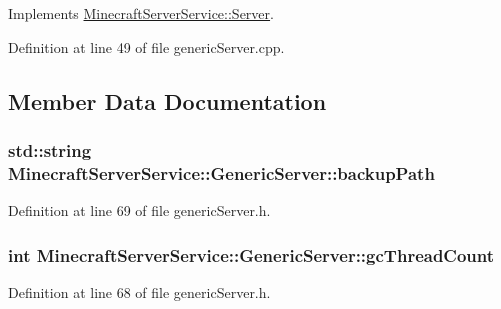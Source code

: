 Implements \hyperlink{class_minecraft_server_service_1_1_server_a0715bfc451f5abbd2f47d0895e5a2355}{Minecraft\+Server\+Service\+::\+Server}.



Definition at line 49 of file generic\+Server.\+cpp.



\subsection{Member Data Documentation}
\subsubsection[{\texorpdfstring{backup\+Path}{backupPath}}]{\setlength{\rightskip}{0pt plus 5cm}std\+::string Minecraft\+Server\+Service\+::\+Generic\+Server\+::backup\+Path\hspace{0.3cm}{\ttfamily [protected]}}\hypertarget{class_minecraft_server_service_1_1_generic_server_a1f4d8509d45d7b8c6cb020499c1da17f}{}\label{class_minecraft_server_service_1_1_generic_server_a1f4d8509d45d7b8c6cb020499c1da17f}


Definition at line 69 of file generic\+Server.\+h.

\subsubsection[{\texorpdfstring{gc\+Thread\+Count}{gcThreadCount}}]{\setlength{\rightskip}{0pt plus 5cm}int Minecraft\+Server\+Service\+::\+Generic\+Server\+::gc\+Thread\+Count\hspace{0.3cm}{\ttfamily [protected]}}\hypertarget{class_minecraft_server_service_1_1_generic_server_ad3e3e744983ef46efed8f5d2189e353f}{}\label{class_minecraft_server_service_1_1_generic_server_ad3e3e744983ef46efed8f5d2189e353f}


Definition at line 68 of file generic\+Server.\+h.

